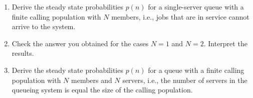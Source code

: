 \begin{question}\label{ex:calling}
  \begin{enumerate}
  \item Derive the steady state probabilities $p(n)$ for a
    single-server queue with a finite calling population with $N$
    members, i.e., jobs that are in service cannot arrive to the system.
  \item Check the answer you obtained for the cases $N=1$ and
    $N=2$. Interpret the results.
  \item Derive the steady state probabilities $p(n)$ for a queue with
    a finite calling population with $N$ members and $N$ servers,
    i.e., the number of servers in the queueing system is equal the
    size of the calling population.
  \end{enumerate}
  

\end{question}
